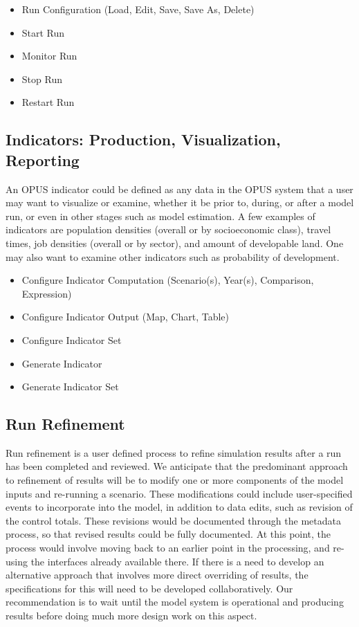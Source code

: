 \begin{itemize}
\item Run Configuration (Load, Edit, Save, Save As, Delete)
\item Start Run
\item Monitor Run
\item Stop Run
\item Restart Run
\end{itemize}

\subsection{Indicators: Production, Visualization, Reporting}

An OPUS indicator could be defined as any data in the OPUS system that a user
may want to visualize or examine, whether it be prior to, during, or after a
model run, or even in other stages such as model estimation.  A few examples
of indicators are population densities (overall or by socioeconomic class),
travel times, job densities (overall or by sector), and amount of developable
land.  One may also want to examine other indicators such as probability of
development.

\begin{itemize}
	\item Configure Indicator Computation (Scenario(s), Year(s), Comparison, Expression)
	\item Configure Indicator Output (Map, Chart, Table)
    \item Configure Indicator Set
    \item Generate Indicator
    \item Generate Indicator Set
\end{itemize}

\subsection{Run Refinement}
Run refinement is a user defined process to refine simulation results after a run has been completed and reviewed.  We anticipate that the predominant approach to refinement of results will be to modify one or more components of the model inputs and re-running a scenario.  These modifications could include user-specified events to incorporate into the model, in addition to data edits, such as revision of the control totals.  These revisions would be documented through the metadata process, so that revised results could be fully documented.  At this point, the process would involve moving back to an earlier point in the processing, and re-using the interfaces already available there.  If there is a need to develop an alternative approach that involves more direct overriding of results, the specifications for this will need to be developed collaboratively.  Our recommendation is to wait until the model system is operational and producing results before doing much more design work on this aspect.

